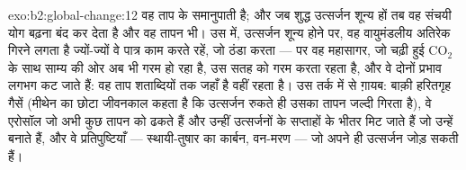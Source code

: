 \begin{solution}{exo:b2:global-change:12}
वह ताप  के समानुपाती है; और जब
शुद्ध उत्सर्जन शून्य हों तब वह संचयी योग बढ़ना बंद कर देता है और वह
तापन भी। उस  में, उत्सर्जन शून्य होने पर, वह
वायुमंडलीय अतिरेक गिरने लगता है ज्यों-ज्यों वे पात्र काम करते रहें, जो
ठंडा करता --- पर वह महासागर, जो चढ़ी हुई \ensuremath{\mathrm{CO_2}} के साथ
साम्य की ओर अब भी गरम हो रहा है, उस सतह को गरम करता रहता है,
और वे दोनों प्रभाव लगभग कट जाते हैं: वह ताप शताब्दियों तक जहाँ है
वहीं रहता है। उस तर्क में से ग़ायब: बाक़ी
हरितगृह गैसें (मीथेन का छोटा जीवनकाल कहता है कि उत्सर्जन रुकते ही उसका तापन
जल्दी गिरता है), वे एरोसॉल जो अभी कुछ तापन को ढकते हैं और
उन्हीं उत्सर्जनों के सप्ताहों के भीतर मिट जाते हैं जो उन्हें बनाते
हैं, और वे प्रतिपुष्टियाँ --- स्थायी-तुषार का कार्बन, वन-मरण ---
जो अपने ही उत्सर्जन जोड़ सकती हैं।
\end{solution}

